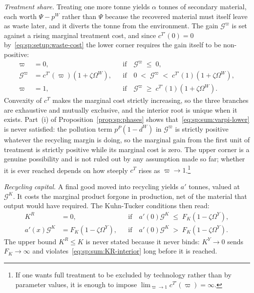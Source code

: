 \emph{Treatment share.} Treating one more tonne yields $\alpha$ tonnes of secondary material, each
worth $\Psi-p^W$ rather than $\Psi$ because the recovered material must itself leave as waste later,
and it diverts the tonne from the environment. The gain $\mathcal G^\varpi$ is set against a rising
marginal treatment cost, and since $c^{T\prime}\left(0\right)=0$ by~\eqref{eq:sp:setup:waste-cost} the
lower corner requires the gain itself to be non-positive:
\begin{subequations}
\label{eq:sp:sum:varpi}
\begin{align}
\varpi &= 0,
&&\text{if}\quad \mathcal G^{\varpi} \;\le\; 0,
\label{eq:sp:sum:varpi-lower}
\\
\mathcal G^{\varpi} &= c^{T\prime}\left(\varpi\right)\left(1+\zeta\Omega^W\right),
&&\text{if}\quad 0 \;<\; \mathcal G^{\varpi} \;<\; c^{T\prime}\left(1\right)\left(1+\zeta\Omega^W\right),
\label{eq:sp:sum:varpi-interior}
\\
\varpi &= 1,
&&\text{if}\quad \mathcal G^{\varpi} \;\ge\; c^{T\prime}\left(1\right)\left(1+\zeta\Omega^W\right).
\label{eq:sp:sum:varpi-upper}
\end{align}
\end{subequations}
Convexity of $c^T$ makes the marginal cost strictly increasing, so the three branches are exhaustive
and mutually exclusive, and the interior root is unique when it exists. Part~(i) of
Proposition~\ref{prop:sp:phases} shows that~\eqref{eq:sp:sum:varpi-lower} is never satisfied: the
pollution term $p^P\left(1-d^W\right)$ in $\mathcal G^\varpi$ is strictly positive whatever the
recycling margin is doing, so the marginal gain from the first unit of treatment is strictly positive
while its marginal cost is zero. The upper corner is a genuine possibility and is not ruled out by any
assumption made so far; whether it is ever reached depends on how steeply $c^T$ rises as
$\varpi\to1$.\footnote{If one wants full treatment to be excluded by technology rather than by
parameter values, it is enough to impose $\lim_{\varpi\to1}c^{T\prime}\left(\varpi\right)=\infty$.}

\emph{Recycling capital.} A final good moved into recycling yields $a'$ tonnes, valued at $\mathcal G^K$. It costs the marginal product forgone in production, net
of the material that output would have required. The Kuhn-Tucker conditions then read:
\begin{subequations}
\label{eq:sp:sum:KR}
\begin{align}
K^R &= 0,
&&\text{if}\quad a'\!\left(0\right)\mathcal G^{K} \;\le\; F_K\left(1-\zeta\Omega^Y\right),
\label{eq:sp:sum:KR-corner}
\\
a'\!\left(x\right)\mathcal G^{K} &= F_K\left(1-\zeta\Omega^Y\right),
&&\text{if}\quad a'\!\left(0\right)\mathcal G^{K} \;>\; F_K\left(1-\zeta\Omega^Y\right).
\label{eq:sp:sum:KR-interior}
\end{align}
\end{subequations}
The upper bound $K^R\le K$ is
never stated because it never binds: $K^Y\to0$ sends $F_K\to\infty$ and
violates~\eqref{eq:sp:sum:KR-interior} long before it is reached.

